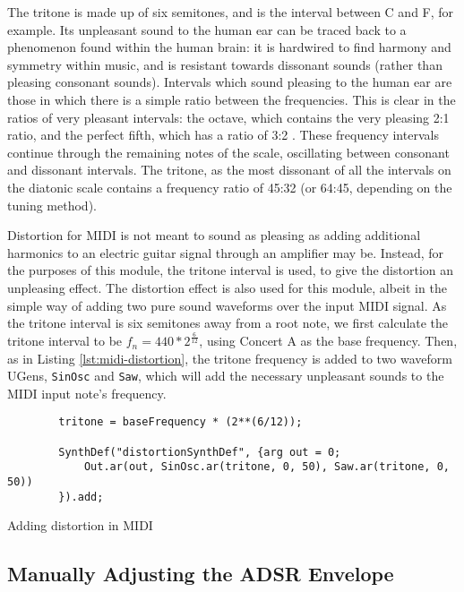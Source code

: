 The tritone is made up of six semitones, and is the interval between C and F\musSharp{}, for example. Its unpleasant sound to the human ear can be traced back to a phenomenon found within the human brain: it is hardwired to find harmony and symmetry within music, and is resistant towards dissonant sounds (rather than pleasing consonant sounds). Intervals which sound pleasing to the human ear are those in which there is a simple ratio between the frequencies. This is clear in the ratios of very pleasant intervals: the octave, which contains the very pleasing 2:1 ratio, and the perfect fifth, which has a ratio of 3:2 \cite{Gann}. These frequency intervals continue through the remaining notes of the scale, oscillating between consonant and dissonant intervals. The tritone, as the most dissonant of all the intervals on the diatonic scale contains a frequency ratio of 45:32 (or 64:45, depending on the tuning method). 

Distortion for MIDI is not meant to sound as pleasing as adding additional harmonics to an electric guitar signal through an amplifier may be. Instead, for the purposes of this module, the tritone interval is used, to give the distortion an unpleasing effect. The distortion effect is also used for this module, albeit in the simple way of adding two pure sound waveforms over the input MIDI signal. As the tritone interval is six semitones away from a root note, we first calculate the tritone interval to be $f_n = 440 * 2^\frac{6}{12}$, using Concert A as the base frequency. Then, as in Listing \ref{lst:midi-distortion}, the tritone frequency is added to two waveform UGens, \texttt{SinOsc} and \texttt{Saw}, which will add the necessary unpleasant sounds to the MIDI input note's frequency.

\begin{listing}
	\begin{lstlisting}
		tritone = baseFrequency * (2**(6/12));
			
		SynthDef("distortionSynthDef", {arg out = 0;
			Out.ar(out, SinOsc.ar(tritone, 0, 50), Saw.ar(tritone, 0, 50))
		}).add;
	\end{lstlisting}
	\caption{Adding distortion in MIDI}
	\label{lst:midi-distortion}
\end{listing}


\subsection{Manually Adjusting the ADSR Envelope}


